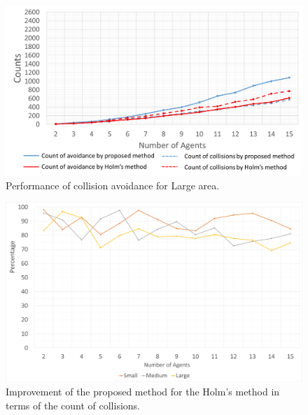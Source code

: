 \begin{figure}[H]\centering
	\includegraphics[width=1.0\textwidth]{Pictures/Area of 125 Percent.png}%
	\caption{Performance of collision avoidance for Large area.}\label{fig:Area of 125 Percent}%
	
\end{figure}
\newpage
\begin{figure}[H]\centering
	\includegraphics[width=1.0\textwidth]{Pictures/Performance of the number of collisions.png}%
	\caption{Improvement of the proposed method for the Holm's method in terms of the count of collisions.}\label{fig:Performance of the number of collisions}%
	
\end{figure}
